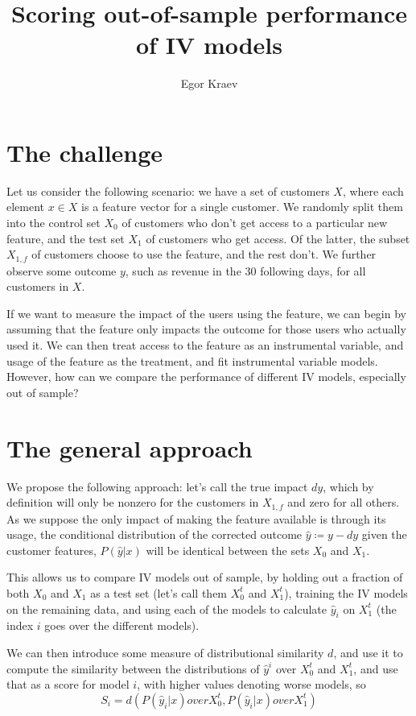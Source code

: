 \documentclass{article}
\title{Scoring out-of-sample performance of IV models}
\author{Egor Kraev}
\begin{document}
\maketitle


\section{The challenge}
Let us consider the following scenario: we have a set of customers $X$, where each element $x\in X$ is a feature vector for a single customer. We randomly split them into the control set $X_0$ of customers who don't get access to a particular new feature, and the test set $X_1$ of customers who get access. Of the latter, the subset $X_{1, f}$ of customers choose to use the feature, and the rest don't. We further observe some outcome $y$, such as revenue in the 30 following days, for all customers in $X$.

If we want to measure the impact of the users using the feature, we can begin by assuming that the feature only impacts the outcome for those users who actually used it. We can then treat access to the feature as an instrumental variable, and usage of the feature as the treatment, and fit instrumental variable models. However, how can we compare the performance of different IV models, especially out of sample?

\section{The general approach}
We propose the following approach: let's call the true impact $dy$, which by definition will only be nonzero for the customers in $X_{1, f}$ and zero for all others. As we suppose the only impact of making the feature available is through its usage, the conditional distribution of the corrected outcome $\hat y \coloneqq y - dy$ given the customer features, $P\left(\hat y | x\right)$ will be identical between the sets $X_0$ and $X_1$.

This allows us to compare IV models out of sample, by holding out a fraction of both $X_0$ and $X_1$ as a test set (let's call them $X^t_0$ and $X^t_1$), training the IV models on the remaining data, and using each of the models to calculate $\hat y_i$ on $X^t_1$ (the index $i$ goes over the different models).

We can then introduce some measure of distributional similarity $d$, and use it to compute the similarity between the distributions of $\hat y^i$ over $X^t_0$ and $X^t_1$, and use that as a score for model $i$, with higher values denoting worse models, so
$$ S_i = d( P\left(\hat y_i | x\right) over X^t_0, P\left(\hat y_i | x\right) over X^t_1) $$
\end{document}
